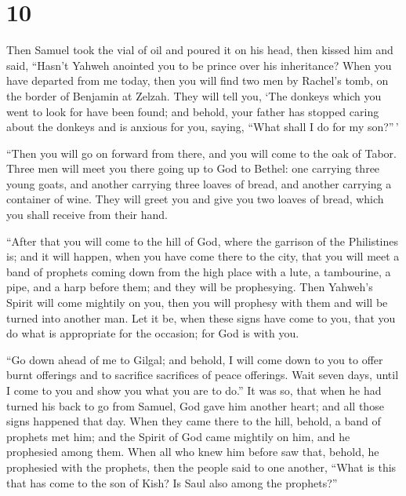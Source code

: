 \hypertarget{section-9}{%
\section{10}\label{section-9}}

 Then Samuel took the vial of oil and poured it on his head,
then kissed him and said, ``Hasn't Yahweh anointed you to be prince over
his inheritance?  When you have departed from me today, then
you will find two men by Rachel's tomb, on the border of Benjamin at
Zelzah. They will tell you, `The donkeys which you went to look for have
been found; and behold, your father has stopped caring about the donkeys
and is anxious for you, saying, ``What shall I do for my son?''\,'

 ``Then you will go on forward from there, and you will come
to the oak of Tabor. Three men will meet you there going up to God to
Bethel: one carrying three young goats, and another carrying three
loaves of bread, and another carrying a container of wine. 
They will greet you and give you two loaves of bread, which you shall
receive from their hand.

 ``After that you will come to the hill of God, where the
garrison of the Philistines is; and it will happen, when you have come
there to the city, that you will meet a band of prophets coming down
from the high place with a lute, a tambourine, a pipe, and a harp before
them; and they will be prophesying.  Then Yahweh's Spirit
will come mightily on you, then you will prophesy with them and will be
turned into another man.  Let it be, when these signs have
come to you, that you do what is appropriate for the occasion; for God
is with you.

 ``Go down ahead of me to Gilgal; and behold, I will come
down to you to offer burnt offerings and to sacrifice sacrifices of
peace offerings. Wait seven days, until I come to you and show you what
you are to do.''  It was so, that when he had turned his
back to go from Samuel, God gave him another heart; and all those signs
happened that day.  When they came there to the hill,
behold, a band of prophets met him; and the Spirit of God came mightily
on him, and he prophesied among them.  When all who knew
him before saw that, behold, he prophesied with the prophets, then the
people said to one another, ``What is this that has come to the son of
Kish? Is Saul also among the prophets?''

